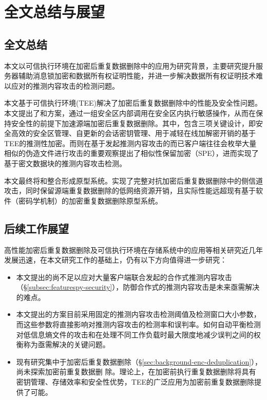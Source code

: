 \chapter{全文总结与展望}

\section{全文总结}

本文以可信执行环境在加密后重复数据删除中的应用为研究背景，主要研究提升服务器辅助消息锁加密和数据所有权证明性能，并进一步解决数据所有权证明技术难以应对的推测内容攻击的检测问题。

本文基于可信执行环境(TEE)解决了加密后重复数据删除中的性能及安全性问题。本文提出了\sysnameS 和\sysnameF 方案，通过一组安全区内部调用在安全区内执行敏感操作，从而在保持安全性的前提下加速源端加密后重复数据删除。其中，\sysnameS 包含三项关键设计，即安全高效的安全区管理、自更新的会话密钥管理、用于减轻在线加解密开销的基于TEE的推测性加密。而\sysnameF 则在基于发起推测内容攻击的而已客户端往往会枚举大量相似的伪造文件进行攻击的重要观察提出了相似性保留加密（SPE），进而实现了基于密文数据块的推测内容攻击检测。

本文最终将\sysnameS 和\sysnameF 整合形成\prototype 原型系统。实现了完整对抗加密后重复数据删除中的侧信道攻击，同时保留源端重复数据删除的低网络资源开销，且实际性能远超现有基于软件（密码学机制）的加密重复数据删除原型系统。

\section{后续工作展望}

高性能加密后重复数据删除及可信执行环境在存储系统中的应用等相关研究近几年发展迅速，在本文研究工作的基础上，仍有以下方向值得进一步研究：

\begin{itemize}
    \item 本文提出的\sysnameF 尚不足以应对大量客户端联合发起的合作式推测内容攻击（\S\ref{subsec:featurespy-security}），防御合作式的推测内容攻击是未来亟需解决的难点。
    \item 本文提出的\sysnameF 方案目前采用固定的推测内容攻击检测阈值及检测窗口大小参数，而这些参数将直接影响对推测内容攻击的检测率和误判率。如何自动平衡检测对低信息熵文件的攻击和在处理不同工作负载时最大限度地减少误判之间的权衡称为亟需解决的关键问题。
    \item 现有研究集中于加密后重复数据删除（\S\ref{sec:background-enc-deduplication}），尚未探索加密前重复数据删
    除。理论上，在加密前执行重复数据删除将具有密钥管理、存储效率和安全性优势，TEE的广泛应用为加密前重复数据删除提供了可能。
\end{itemize}
